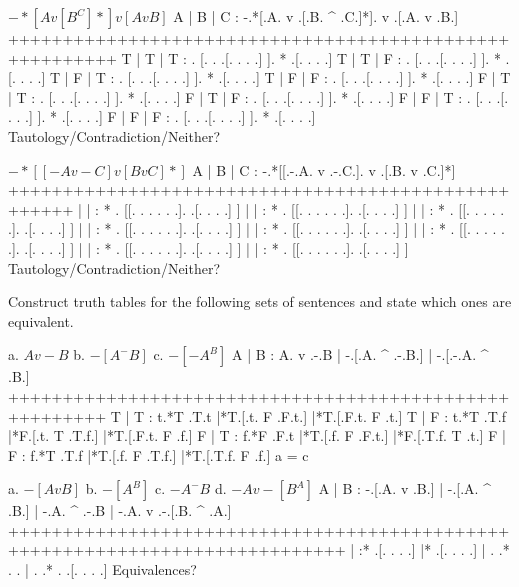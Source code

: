 $ -*[A v [B ^ C]*] v [A v B] $
        \answer
        \truthtable
         A | B | C : -.*[.A. v .[.B. ^ .C.]*].  v  .[.A. v .B.]
        ++++++++++++++++++++++++++++++++++++++++++++++++++++++++
         T | T | T :  . [. .   .[. .   . .] ]. *   .[. .   . .]
         T | T | F :  . [. .   .[. .   . .] ]. *   .[. .   . .]
         T | F | T :  . [. .   .[. .   . .] ]. *   .[. .   . .]
         T | F | F :  . [. .   .[. .   . .] ]. *   .[. .   . .]
         F | T | T :  . [. .   .[. .   . .] ]. *   .[. .   . .]
         F | T | F :  . [. .   .[. .   . .] ]. *   .[. .   . .]
         F | F | T :  . [. .   .[. .   . .] ]. *   .[. .   . .]
         F | F | F :  . [. .   .[. .   . .] ]. *   .[. .   . .]
        \endtruthtable
        Tautology/Contradiction/Neither?
        \endanswer

$ -*[[-A v -C] v [B v C]*] $
        \answer
        \truthtable
         A | B | C :  -.*[[.-.A. v .-.C.]. v .[.B. v .C.]*]
        ++++++++++++++++++++++++++++++++++++++++++++++++++++
           |   |   : * . [[. . .   . . .].   .[. .   . .] ]
           |   |   : * . [[. . .   . . .].   .[. .   . .] ]
           |   |   : * . [[. . .   . . .].   .[. .   . .] ]
           |   |   : * . [[. . .   . . .].   .[. .   . .] ]
           |   |   : * . [[. . .   . . .].   .[. .   . .] ]
           |   |   : * . [[. . .   . . .].   .[. .   . .] ]
           |   |   : * . [[. . .   . . .].   .[. .   . .] ]
           |   |   : * . [[. . .   . . .].   .[. .   . .] ]
        \endtruthtable
        Tautology/Contradiction/Neither?
        \endanswer

\endproblems

Construct truth tables for the following sets of sentences and state which ones are equivalent.

\problems
{}
\list
a. $ A v -B $
b. $ -[A ^ -B] $
c. $ -[-A ^ B] $
\endlist
        \answer
        \truthtable
         A | B : A. v .-.B | -.[.A. ^ .-.B.] | -.[.-.A. ^ .B.]
        +++++++++++++++++++++++++++++++++++++++++++++++++++++++
         T | T : t.*T .T.t |*T.[.t. F .F.t.] |*T.[.F.t. F .t.]
         T | F : t.*T .T.f |*F.[.t. T .T.f.] |*T.[.F.t. F .f.]
         F | T : f.*F .F.t |*T.[.f. F .F.t.] |*F.[.T.f. T .t.]
         F | F : f.*T .T.f |*T.[.f. F .T.f.] |*T.[.T.f. F .f.]
        \endtruthtable
        a = c
        \endanswer

\list
a. $ -[A v B] $
b. $ -[A ^ B] $
c. $ -A ^ -B $
d. $ -A v -[B ^ A] $
\endlist
        \answer
        \truthtable
         A | B : -.[.A. v .B.] | -.[.A. ^ .B.] | -.A. ^ .-.B | -.A. v .-.[.B. ^ .A.]
        +++++++++++++++++++++++++++++++++++++++++++++++++++++++++++++++++++++++++++++
           |   :* .[. .   . .] |* .[. .   . .] |  . .*  . .  |  . .*  . .[. .   . .]
        \endtruthtable
        Equivalences?
        \endanswer

